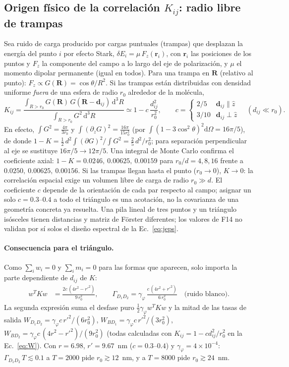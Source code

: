 \documentclass[11pt,a4paper]{article}
\newcommand{\gphi}{\gamma_\varphi}
\begin{document}
\subsection{Origen físico de la correlación $K_{ij}$: radio libre de trampas}\label{sec:trampas}
Sea ruido de carga producido por cargas puntuales (trampas) que desplazan la energía del punto $i$ por efecto Stark, $\delta E_i=\mu\,F_z(\bm r_i)$,
con $\bm r_i$ las posiciones de los puntos y $F_z$ la componente del campo a lo largo del eje de polarización, y $\mu$ el momento dipolar permanente (igual en todos).
Para una trampa en $\bm R$ (relativo al punto): $F_z\propto G(\bm R)=\cos\theta/R^2$. Si las trampas están distribuidas con densidad uniforme \emph{fuera} de una esfera de radio $r_0$ alrededor de la molécula,
\begin{equation}
K_{ij}=\frac{\int_{R>r_0}G(\bm R)\,G(\bm R-\bm d_{ij})\,\mathrm d^3R}{\int_{R>r_0}G^2\,\mathrm d^3R}\simeq1-c\,\frac{d_{ij}^2}{r_0^2},\qquad
c=\begin{cases}2/5 & \bm d_{ij}\parallel\hat z\\ 3/10 & \bm d_{ij}\perp\hat z\end{cases}\quad(d_{ij}\ll r_0).
\end{equation}
En efecto, $\int G^2=\tfrac{4\pi}{3r_0}$ y $\int(\partial_zG)^2=\tfrac{16\pi}{15r_0^3}$ (por $\int(1-3\cos^2\theta)^2\mathrm d\Omega=16\pi/5$), de donde $1-K=\tfrac12\,d^2\!\int(\partial G)^2/\!\int G^2=\tfrac25\,d^2/r_0^2$;
para separación perpendicular al eje se sustituye $16\pi/5\to12\pi/5$. Una integral de Monte Carlo confirma el coeficiente axial:
$1-K=0.0246,\ 0.00625,\ 0.00159$ para $r_0/d=4,8,16$ frente a $0.0250,\ 0.00625,\ 0.00156$.
Si las trampas llegan hasta el punto ($r_0\to0$), $K\to0$: la correlación espacial exige un volumen libre de carga de radio $r_0\gg d$.
El coeficiente $c$ depende de la orientación de cada par respecto al campo;
asignar un solo $c=0.3$--$0.4$ a todo el triángulo es una acotación,
no la covarianza de una geometría concreta ya resuelta. Una pila lineal
de tres puntos y un triángulo isósceles tienen distancias y matriz de
Förster diferentes; los valores de F14 no validan por sí solos el
diseño espectral de la Ec.~\eqref{eq:jeps}.

\paragraph{Consecuencia para el triángulo.}
Como $\sum_iw_i=0$ y $\sum_im_i=0$ para las formas que aparecen, solo importa la parte dependiente de $d_{ij}$ de $K$:
\begin{align}
w^TKw&=\frac{2c\,(4r^2-r'^2)}{9\,r_0^2},\qquad
\Gamma_{D_1D_2}=\gphi\,\frac{c\,(4r^2+r'^2)}{6\,r_0^2}\quad\text{(ruido blanco)}.
\end{align}
La segunda expresión suma el desfase puro $\tfrac12\gphi w^TKw$ y la mitad de las tasas de salida $W_{D_1D_2}=\gphi c\,r'^2/(6r_0^2)$, $W_{BD_1}=\gphi c\,r'^2/(3r_0^2)$, $W_{BD_2}=\gphi c\,(4r^2-r'^2)/(9r_0^2)$
(todas calculadas con $K_{ij}=1-cd_{ij}^2/r_0^2$ en la Ec.~\eqref{eq:W}). Con $r=6.98$, $r'=9.67$~nm ($c=0.3$--$0.4$) y $\gphi=4\times10^{-4}$:
$\Gamma_{D_1D_2}\,T\lesssim0.1$ a $T=2000$ pide $r_0\gtrsim12$~nm, y a $T=8000$ pide $r_0\gtrsim24$~nm.
\end{document}
